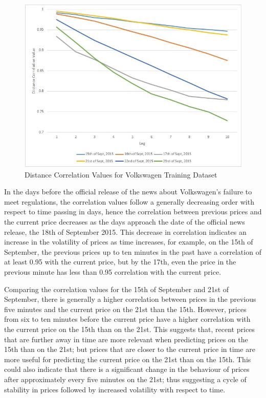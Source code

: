 \documentclass[13pt]{report}
\begin{document}
\begin{figure}[H]
\centering
\label{distancecorrelationfig}
\includegraphics[width= 1\textwidth]{distancecorrelation}
\caption{Distance Correlation Values for Volkswagen Training Dataset}
\end{figure}

In the days before the official release of the news about Volkswagen's failure to meet regulations, the correlation values follow a generally decreasing order with respect to time passing in days, hence the correlation between previous prices and the current price decreases as the days approach the date of the official news release, the 18th of September 2015. This decrease in correlation indicates an increase in the volatility of prices as time increases, for example, on the 15th of September, the previous prices up to ten minutes in the past have a correlation of at least 0.95 with the current price, but by the 17th, even the price in the previous minute has less than 0.95 correlation with the current price. \par

Comparing the correlation values for the 15th of September and 21st of September, there is generally a higher correlation between prices in the previous five minutes and the current price on the 21st than the 15th. However, prices from six to ten minutes before the current price have a higher correlation with the current price on the 15th than on the 21st. This suggests that, recent prices that are further away in time are more relevant when predicting prices on the 15th than on the 21st; but prices that are closer to the current price in time are more useful for predicting the current price on the 21st than on the 15th. This could also indicate that there is a significant change in the behaviour of prices after approximately every five minutes  on the 21st; thus suggesting a cycle of stability in prices followed by increased volatility with respect to time.\par
\end{document}
